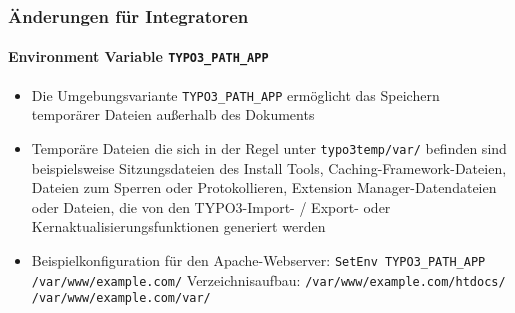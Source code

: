 \begin{frame}[fragile]
	\frametitle{Änderungen für Integratoren}
	\framesubtitle{Environment Variable \texttt{TYPO3\_PATH\_APP}}

	\lstset{basicstyle=\tiny\ttfamily}

	\begin{itemize}
		\item Die Umgebungsvariante \texttt{TYPO3\_PATH\_APP} ermöglicht das Speichern temporärer Dateien
			außerhalb des Dokuments

		\item Temporäre Dateien die sich in der Regel unter \texttt{typo3temp/var/} befinden sind
			beispielsweise Sitzungsdateien des Install Tools, Caching-Framework-Dateien, Dateien
			zum Sperren oder Protokollieren, Extension Manager-Datendateien oder Dateien,
			die von den TYPO3-Import- / Export- oder Kernaktualisierungsfunktionen generiert werden

		\item Beispielkonfiguration für den Apache-Webserver:\newline
			\smaller
				\texttt{SetEnv TYPO3\_PATH\_APP /var/www/example.com/}
			\normalsize
			\newline
			Verzeichnisaufbau:
			\newline
			\smaller
				\texttt{/var/www/example.com/htdocs/}\newline
				\texttt{/var/www/example.com/var/}
			\normalsize

	\end{itemize}

\end{frame}


